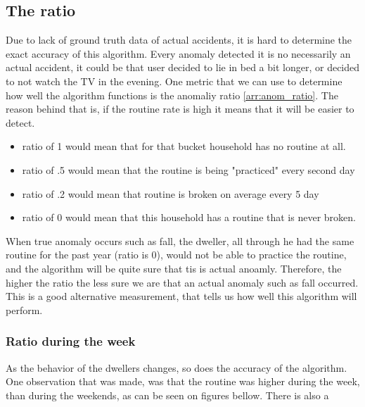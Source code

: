 \subsection{The ratio}

Due to lack of ground truth data of actual accidents, it is hard to determine the 
exact accuracy of this algorithm. Every anomaly detected it is no necessarily an 
actual accident, it could be that user decided to lie in bed a bit longer, or decided to not watch 
the TV in the evening.
One metric that we can use to determine how well the algorithm functions is the anomaliy ratio \ref{arr:anom_ratio}.
The reason behind that is, if the routine rate is high it means that it will be easier to detect.

\begin{itemize}
	\item ratio of 1 would mean that for that bucket household has no routine at all.
    \item ratio of .5 would mean that the routine is being "practiced" every second day
    \item ratio of .2 would mean that routine is broken on average every 5 day
    \item ratio of 0 would mean that this household has a routine that is never broken. 
\end{itemize}

When true anomaly occurs such as fall, the dweller, all through he had the same routine for the past year (ratio is 0), would not be able to practice the routine, and the algorithm will be quite sure that tis is actual anoamly.
Therefore, the higher the ratio the less sure we are that an actual anomaly such as fall occurred.
This is a good alternative measurement, that tells us how well this algorithm will perform. 

\subsubsection{Ratio during the week} \label{sssec:ratio_week}

As the behavior of the dwellers changes, so does the accuracy of the algorithm. 
One observation that was made, was that the routine was higher during the week, than during the weekends,
as can be seen on figures bellow. There is also a 

